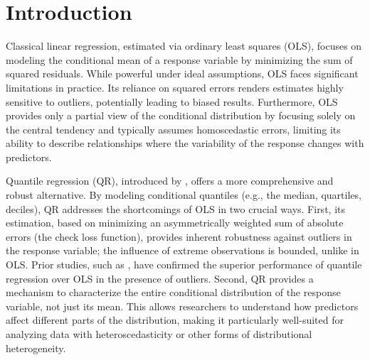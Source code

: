 \documentclass[fleqn,10pt]{latex/stylish_article} %
\affiliation{

}
\affiliation{*\textbf{Contact}: , \href{mailto:XXXXXXXXX@alumnos.uc3m.es}{\nolinkurl{XXXXXXXXX@alumnos.uc3m.es}} and \href{mailto:100508278@alumnos.uc3m.es}{\nolinkurl{100508278@alumnos.uc3m.es}}} %
\begin{document}

\flushbottom %

\maketitle %

\tableofcontents %

\thispagestyle{empty} %


\section{Introduction}\label{introduction}

Classical linear regression, estimated via ordinary least squares (OLS), focuses on modeling the conditional mean of a response variable by minimizing the sum of squared residuals. While powerful under ideal assumptions, OLS faces significant limitations in practice. Its reliance on squared errors renders estimates highly sensitive to outliers, potentially leading to biased results. Furthermore, OLS provides only a partial view of the conditional distribution by focusing solely on the central tendency and typically assumes homoscedastic errors, limiting its ability to describe relationships where the variability of the response changes with predictors.

Quantile regression (QR), introduced by \citet{Koenker1978}, offers a more comprehensive and robust alternative. By modeling conditional quantiles (e.g., the median, quartiles, deciles), QR addresses the shortcomings of OLS in two crucial ways. First, its estimation, based on minimizing an asymmetrically weighted sum of absolute errors (the check loss function), provides inherent robustness against outliers in the response variable; the influence of extreme observations is bounded, unlike in OLS. Prior studies, such as \citet{Onyedikachi2015}, have confirmed the superior performance of quantile regression over OLS in the presence of outliers. Second, QR provides a mechanism to characterize the entire conditional distribution of the response variable, not just its mean. This allows researchers to understand how predictors affect different parts of the distribution, making it particularly well-suited for analyzing data with heteroscedasticity or other forms of distributional heterogeneity.
\end{document}
